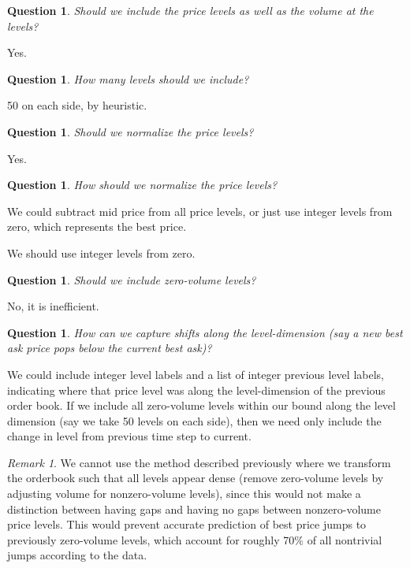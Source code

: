 \documentclass[12pt, reqno]{amsart}
\theoremstyle{definition}
\theoremstyle{definition}
\theoremstyle{plain}
\newtheorem{Ques}[theorem]{Question}
\theoremstyle{definition}
\theoremstyle{remark}
\newtheorem{rem}[theorem]{Remark}
\renewcommand{\'}{\hspace{0.5mm}'}			%
\begin{document}
\begin{Ques}\label{includelevels}
	Should we include the price levels as well as the volume at the levels?
\end{Ques}

Yes. 

\begin{Ques}
	How many levels should we include?
\end{Ques}

50 on each side, by heuristic. 

\begin{Ques}
	Should we normalize the price levels?
\end{Ques}

Yes. 

\begin{Ques}
	How should we normalize the price levels?
\end{Ques}
We could subtract mid price from all price levels, or just use integer levels from zero, which represents the best price. 

We should use integer levels from zero. 

\begin{Ques}
	Should we include zero-volume levels?
\end{Ques}

No, it is inefficient.

\begin{Ques}
	How can we capture shifts along the level-dimension (say a new best ask price pops below the current best ask)?
\end{Ques}

We could include integer level labels and a list of integer previous level labels, indicating where that price level was along the level-dimension of the previous order book. If we include all zero-volume levels within our bound along the level dimension (say we take 50 levels on each side), then we need only include the change in level from previous time step to current. 

\begin{rem}
	We cannot use the method described previously where we transform the orderbook such that all levels appear dense (remove zero-volume levels by adjusting volume for nonzero-volume levels), since this would not make a distinction between having gaps and having no gaps between nonzero-volume price levels. This would prevent accurate prediction of best price jumps to previously zero-volume levels, which account for roughly 70\% of all nontrivial jumps according to the data. 
\end{rem}
\end{document}
